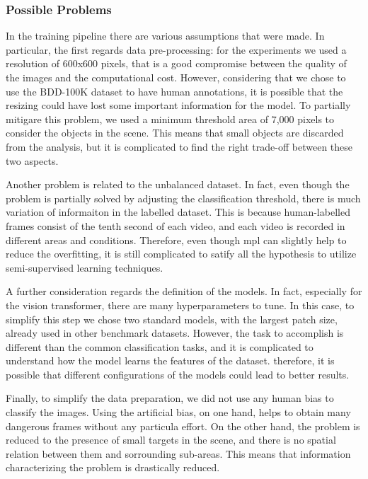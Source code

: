 \subsubsection{Possible Problems}
In the training pipeline there are various assumptions that were made. 
In particular, the first regards data pre-processing: for the experiments we 
used a resolution of 600x600 pixels, that is a good compromise between the 
quality of the images and the computational cost. However, considering that 
we chose to use the BDD-100K dataset to have human annotations, it is possible 
that the resizing could have lost some important information for the model. 
To partially mitigare this problem, we used a minimum threshold area of 7,000 
pixels to consider the objects in the scene. This means that small objects 
are discarded from the analysis, but it is complicated to find the right 
trade-off between these two aspects.

Another problem is related to the unbalanced dataset. In fact, even though the 
problem is partially solved by adjusting the classification threshold, 
there is much variation of informaiton in the labelled dataset. This is because 
human-labelled frames consist of the tenth second of each video, and each 
video is recorded in different areas and conditions. Therefore, even though 
\acl{mpl} can slightly help to reduce the overfitting, it is still complicated 
to satify all the hypothesis to utilize semi-supervised learning techniques.

A further consideration regards the definition of the models. In fact, especially 
for the vision transformer, there are many hyperparameters to tune. In this case, 
to simplify this step we chose two standard models, with the largest patch size,
already used in other benchmark datasets. However, the task to accomplish is 
different than the common classification tasks, and it is complicated to understand 
how the model learns the features of the dataset. therefore, it is possible 
that different configurations of the models could lead to better results.

Finally, to simplify the data preparation, we did not use any human bias to 
classify the images. Using the artificial bias, on one hand, helps to obtain 
many dangerous frames without any particula effort. On the other hand, the problem 
is reduced to the presence of small targets in the scene, and there is no spatial 
relation between them and sorrounding sub-areas. This means that information 
characterizing the problem is drastically reduced.

